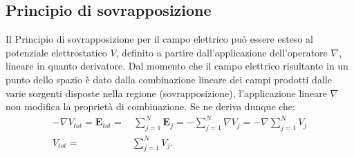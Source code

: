 \documentclass[a4paper,11pt]{report}
\begin{document}
\subsection{Principio di sovrapposizione}
Il Principio di sovrapposizione per il campo elettrico può essere esteso al potenziale elettrostatico $V$, definito a partire dall'applicazione dell'operatore $\nabla$, lineare in quanto derivatore. Dal momento che il campo elettrico risultante in un punto dello spazio è dato dalla combinazione lineare dei campi prodotti dalle varie sorgenti disposte nella regione (sovrapposizione), l'applicazione lineare $\nabla$ non modifica la proprietà di combinazione. Se ne deriva dunque che:
\begin{equation}
\begin{aligned}
   -\nabla V_{tot} = \bm{E}_{tot} =& \, \sum_{j=1}^{N} \bm{E}_j = -\sum_{j=1}^{N}\nabla V_{j} = -\nabla \sum_{j=1}^{N} V_j \\
    V_{tot} =& \sum_{j=1}^{N} V_j.
    \end{aligned}
    \label{eq:sovrapposizione_potenziale}
\end{equation}
\end{document}
